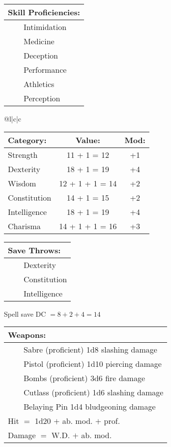 \documentclass[11pt]{article}
\newcommand{\tabitem}{~~\llap{--}~~}
\begin{document}
\begin{multicols}{2}
\vspace{2mm}

\noindent \begin{tabularx}{\linewidth}{@{}l}
{\Large \textbf{Skill Proficiencies:}} \\
\hline
\tabitem Intimidation \\
\tabitem Medicine \\
\tabitem Deception \\
\tabitem Performance \\
\tabitem Athletics \\
\tabitem Perception
		\end{tabularx}

\vspace{4mm}

\noindent \begin{tabularx}{\linewidth}{@{}l|c|c}
 \\
\hline
		\end{tabularx}
\noindent \begin{tabular}{@{}l|c|c}
\textbf{Category:} 			& \textbf{Value:} 	& \textbf{Mod:} \\
\hline
Strength 					& 11 + 1 = 12		& +1		\\
Dexterity 					& 18 + 1 = 19 		& +4		\\
Wisdom 						& 12 + 1 + 1 = 14	& +2		\\
Constitution 				& 14 + 1 = 15 		& +2		\\
Intelligence 				& 18 + 1 = 19 		& +4		\\
Charisma 					& 14 + 1 + 1 = 16	& +3
		\end{tabular}

\vspace{4mm}

\noindent \begin{tabularx}{\linewidth}{@{}l}
{\Large \textbf{Save Throws:}} \\
\hline
\tabitem Dexterity \\
\tabitem Constitution \\
\tabitem Intelligence \\
		\end{tabularx}
\noindent Spell save DC $= 8 + 2 + 4 = 14$

\vspace{4mm}

\noindent \begin{tabularx}{\linewidth}{@{}l}
{\Large \textbf{Weapons:}} \\
\hline
\tabitem Sabre (proficient) 1d8 slashing damage \\
\tabitem Pistol (proficient) 1d10 piercing damage \\
\tabitem Bombs (proficient) 3d6 fire damage \\
\tabitem Cutlass (proficient) 1d6 slashing damage \\
\tabitem Belaying Pin 1d4 bludgeoning damage \\
Hit $=$ 1d20 $+$ ab. mod. $+$ prof. \\
Damage $=$ W.D. $+$ ab. mod.
		\end{tabularx}


\end{multicols}
\end{document}
